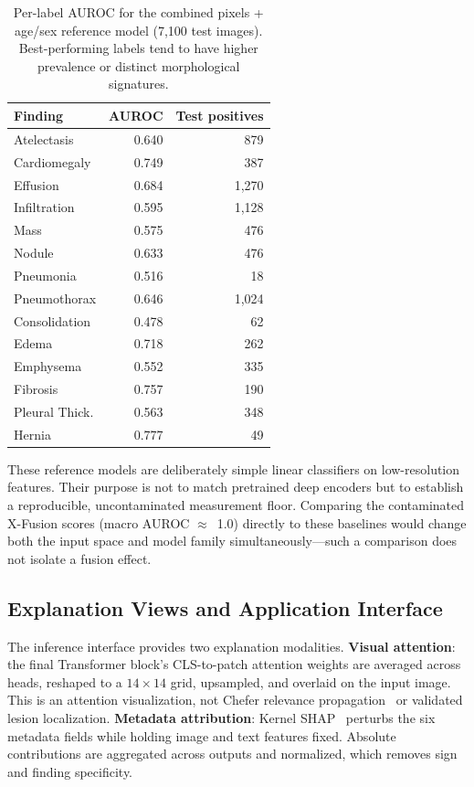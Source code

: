 \documentclass[runningheads,a4paper]{llncs}
\begin{document}
\begin{table}[t]
\caption{Per-label AUROC for the combined pixels + age/sex reference model (7{,}100 test images). Best-performing labels tend to have higher prevalence or distinct morphological signatures.}
\label{tab:perlabel}
\centering\small
\begin{tabular}{lrr}
\toprule
Finding & AUROC & Test positives\\
\midrule
Atelectasis & 0.640 & 879\\
Cardiomegaly & 0.749 & 387\\
Effusion & 0.684 & 1{,}270\\
Infiltration & 0.595 & 1{,}128\\
Mass & 0.575 & 476\\
Nodule & 0.633 & 476\\
Pneumonia & 0.516 & 18\\
Pneumothorax & 0.646 & 1{,}024\\
Consolidation & 0.478 & 62\\
Edema & 0.718 & 262\\
Emphysema & 0.552 & 335\\
Fibrosis & 0.757 & 190\\
Pleural Thick. & 0.563 & 348\\
Hernia & 0.777 & 49\\
\bottomrule
\end{tabular}
\end{table}

These reference models are deliberately simple linear classifiers on low-resolution features.
Their purpose is not to match pretrained deep encoders but to establish a reproducible, uncontaminated measurement floor.
Comparing the contaminated X-Fusion scores (macro AUROC $\approx$~1.0) directly to these baselines would change both the input space and model family simultaneously---such a comparison does not isolate a fusion effect.

\subsection{Explanation Views and Application Interface}

The inference interface provides two explanation modalities.
\textbf{Visual attention}: the final Transformer block's CLS-to-patch attention weights are averaged across heads, reshaped to a $14\!\times\!14$ grid, upsampled, and overlaid on the input image.
This is an attention visualization, not Chefer relevance propagation~\cite{chefer2021} or validated lesion localization.
\textbf{Metadata attribution}: Kernel SHAP~\cite{lundberg2017} perturbs the six metadata fields while holding image and text features fixed.
Absolute contributions are aggregated across outputs and normalized, which removes sign and finding specificity.
\end{document}
